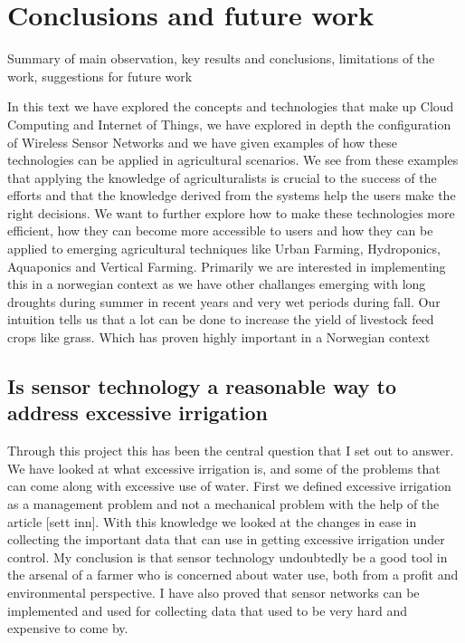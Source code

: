 \documentclass[]{uiophd}
\begin{document}
\chapter{Conclusions and future work}

Summary of main observation, key results and conclusions, limitations of the work, suggestions for future work

In this text we have explored the concepts and technologies that make up Cloud Computing and Internet of Things, we have explored in depth the configuration of Wireless Sensor Networks and we have given examples of how these technologies can be applied in agricultural scenarios. We see from these examples that applying the knowledge of agriculturalists is crucial to the success of the efforts and that the knowledge derived from the systems help the users make the right decisions. We want to further explore how to make these technologies more efficient, how they can become more accessible to users and how they can be applied to emerging agricultural techniques like Urban Farming, Hydroponics, Aquaponics and Vertical Farming. Primarily we are interested in implementing this in a norwegian context as we have other challanges emerging with long droughts during summer in recent years and very wet periods during fall. Our intuition tells us that a lot can be done to increase the yield of livestock feed crops like grass. Which has proven highly important in a Norwegian context


\section{ Is sensor technology a reasonable way to address excessive irrigation}

Through this project this has been the central question that I set out to answer. We have looked at what excessive irrigation is, and some of the problems that can come along with excessive use of water. First we defined excessive irrigation as a management problem and not a mechanical problem with the help of the article [sett inn]. With this knowledge we looked at the changes in ease in collecting the important data that can use in getting excessive irrigation under control. My conclusion is that sensor technology undoubtedly be a good tool in the arsenal of a farmer who is concerned about water use, both from a profit and environmental perspective. I have also proved that sensor networks can be implemented and used for collecting data that used to be very hard and expensive to come by.
\end{document}
